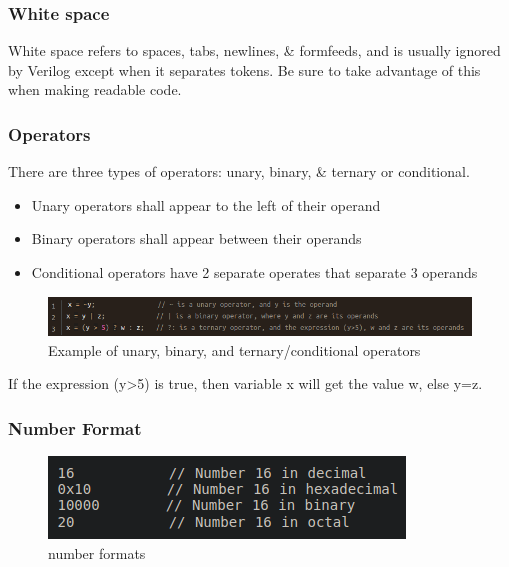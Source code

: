 \documentclass{article}
\begin{document}
	\subsubsection{White space}

	White space refers to spaces, tabs, newlines, \& formfeeds, and is usually ignored by Verilog except when it separates tokens. Be sure to take advantage of this when making readable code. \newline

	\subsubsection{Operators}

	There are three types of operators: unary, binary, \& ternary or conditional. \newline

	\begin{itemize}
		\item Unary operators shall appear to the left of their operand
		\item Binary operators shall appear between their operands
		\item Conditional operators have 2 separate operates that separate 3 operands
	\end{itemize}

	\begin{figure}[H]
		\includegraphics[width=\linewidth]{VerilogPics/figure_3.png}
		\caption{Example of unary, binary, and ternary/conditional operators}
		\label{Example of unary, binary, and ternary/conditional operators}
	\end{figure}

	If the expression (y>5) is true, then variable x will get the value w, else y=z.

	\subsubsection{Number Format}

	\begin{figure}[H]
		\includegraphics[width=\linewidth]{VerilogPics/figure_4.png}
		\caption{number formats}
		\label{number formats}
	\end{figure}
\end{document}
